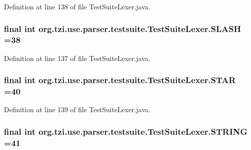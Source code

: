 Definition at line 138 of file Test\-Suite\-Lexer.\-java.

\hypertarget{classorg_1_1tzi_1_1use_1_1parser_1_1testsuite_1_1_test_suite_lexer_a19d8bc7074f3b0ed53d852815c90cce9}{
\subsubsection[{S\-L\-A\-S\-H}]{\setlength{\rightskip}{0pt plus 5cm}final int org.\-tzi.\-use.\-parser.\-testsuite.\-Test\-Suite\-Lexer.\-S\-L\-A\-S\-H =38\hspace{0.3cm}{\ttfamily [static]}}}\label{classorg_1_1tzi_1_1use_1_1parser_1_1testsuite_1_1_test_suite_lexer_a19d8bc7074f3b0ed53d852815c90cce9}


Definition at line 137 of file Test\-Suite\-Lexer.\-java.

\hypertarget{classorg_1_1tzi_1_1use_1_1parser_1_1testsuite_1_1_test_suite_lexer_a7a63c13c32a08ee688e868832265201d}{
\subsubsection[{S\-T\-A\-R}]{\setlength{\rightskip}{0pt plus 5cm}final int org.\-tzi.\-use.\-parser.\-testsuite.\-Test\-Suite\-Lexer.\-S\-T\-A\-R =40\hspace{0.3cm}{\ttfamily [static]}}}\label{classorg_1_1tzi_1_1use_1_1parser_1_1testsuite_1_1_test_suite_lexer_a7a63c13c32a08ee688e868832265201d}


Definition at line 139 of file Test\-Suite\-Lexer.\-java.

\hypertarget{classorg_1_1tzi_1_1use_1_1parser_1_1testsuite_1_1_test_suite_lexer_a1456eac895d706d801c864adbfd3565c}{
\subsubsection[{S\-T\-R\-I\-N\-G}]{\setlength{\rightskip}{0pt plus 5cm}final int org.\-tzi.\-use.\-parser.\-testsuite.\-Test\-Suite\-Lexer.\-S\-T\-R\-I\-N\-G =41\hspace{0.3cm}{\ttfamily [static]}}}\label{classorg_1_1tzi_1_1use_1_1parser_1_1testsuite_1_1_test_suite_lexer_a1456eac895d706d801c864adbfd3565c}


